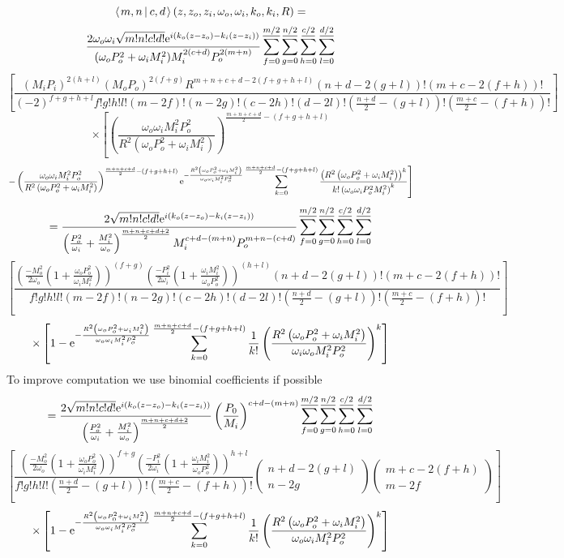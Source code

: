 \documentclass[11pt]{amsart}
\makeatletter
\newcommand{\e}{{\rm e}}				%
\newcommand{\msp}[1]{\mspace{#1mu}}		%
\newcommand{\0}{\varnothing}		%
\newcommand{\brac}[2]{\left\langle\msp{2} #1\left\lvert \msp{3.5} #2 \right.\right\rangle}	%
\newcommand{\1}{!}
\newcommand{\2}{@}
\newcommand{\3}{\#}
\newcommand{\4}{\$}
\newcommand{\5}{\%}
\newcommand{\6}{$^\wedge$}
\newcommand{\7}{\&}
\newcommand{\8}{*}
\newcommand{\9}{(}
\makeatother
\begin{document}
\[
\brac{m,n}{c,d}(z,z_o,z_i,\omega_o,\omega_i,k_o,k_i,R) = 
\]
\[
\frac{2\omega_o\omega_i\sqrt{m!n!c!d!}\e^{i(k_o(z-z_o)-k_i(z-z_i))}}{(\omega_oP_o^2+\omega_iM_i^2)M_i^{2(c+d)}P_o^{2(m+n)}}\sum_{f=0}^{\underline{m/2}}\sum_{g=0}^{\underline{n/2}}\sum_{h=0}^{\underline{c/2}}\sum_{l=0}^{\underline{d/2}}
\]
\[
\left[\frac{(M_iP_i)^{2(h+l)}(M_oP_o)^{2(f+g)}R^{m+n+c+d-2(f+g+h+l)}(n+d-2(g+l))!(m+c-2(f+h))!}{(-2)^{f+g+h+l}f!g!h!l!(m-2f)!(n-2g)!(c-2h)!(d-2l)!\left(\frac{n+d}{2}-(g+l)\right)!\left(\frac{m+c}{2}-(f+h)\right)!}\right]
\]
\[
\times\left[\left(\frac{\omega_o\omega_iM_i^2P_o^2}{R^2\left(\omega_oP_o^2+\omega_iM_i^2\right)}\right)^{\frac{m+n+c+d}{2}-(f+g+h+l)}\right.
\]
\[
\left.-\left(\frac{\omega_o\omega_iM_i^2P_o^2}{R^2\left(\omega_oP_o^2+\omega_iM_i^2\right)}\right)^{\frac{m+n+c+d}{2}-(f+g+h+l)}\e^{-\frac{R^2\left(\omega_oP_o^2+\omega_iM_i^2\right)}{\omega_o\omega_iM_i^2P_o^2}}\sum_{k=0}^{\frac{m+n+c+d}{2}-(f+g+h+l)}\frac{\left(R^2\left(\omega_oP_o^2+\omega_iM_i^2\right)\right)^k}{k!\left(\omega_o\omega_iP_o^2M_i^2\right)^k}\right]
\]
\[
=\frac{2\sqrt{m!n!c!d!}\e^{i(k_o(z-z_o)-k_i(z-z_i))}}{\left(\frac{P_o^2}{\omega_i}+\frac{M_i^2}{\omega_o}\right)^{\frac{m+n+c+d+2}{2}}M_i^{c+d-(m+n)}P_o^{m+n-(c+d)}}\sum_{f=0}^{\underline{m/2}}\sum_{g=0}^{\underline{n/2}}\sum_{h=0}^{\underline{c/2}}\sum_{l=0}^{\underline{d/2}}
\]
\[
\left[\frac{\left(\frac{-M_o^2}{2\omega_o}\left(1+\frac{\omega_oP_o^2}{\omega_iM_i^2}\right)\right)^{(f+g)}\left(\frac{-P_i^2}{2\omega_i}\left(1+\frac{\omega_iM_i^2}{\omega_oP_o^2}\right)\right)^{(h+l)}(n+d-2(g+l))!(m+c-2(f+h))!}{f!g!h!l!(m-2f)!(n-2g)!(c-2h)!(d-2l)!\left(\frac{n+d}{2}-(g+l)\right)!\left(\frac{m+c}{2}-(f+h)\right)!}\right]
\]
\[
\times\left[1-\e^{-\frac{R^2\left(\omega_oP_o^2+\omega_iM_i^2\right)}{\omega_o\omega_iM_i^2P_o^2}}\sum_{k=0}^{\frac{m+n+c+d}{2}-(f+g+h+l)}\frac{1}{k!}\left(\frac{R^2\left(\omega_oP_o^2+\omega_iM_i^2\right)}{\omega_i\omega_oM_i^2P_o^2}\right)^k\right]
\]
To improve computation we use binomial coefficients if possible
\[
=\frac{2\sqrt{m!n!c!d!}\e^{i(k_o(z-z_o)-k_i(z-z_i))}}{\left(\frac{P_o^2}{\omega_i}+\frac{M_i^2}{\omega_o}\right)^{\frac{m+n+c+d+2}{2}}}\left(\frac{P_0}{M_i}\right)^{c+d-(m+n)}\sum_{f=0}^{\underline{m/2}}\sum_{g=0}^{\underline{n/2}}\sum_{h=0}^{\underline{c/2}}\sum_{l=0}^{\underline{d/2}}
\]
\[
\left[\frac{\left(\frac{-M_o^2}{2\omega_o}\left(1+\frac{\omega_oP_o^2}{\omega_iM_i^2}\right)\right)^{f+g}\left(\frac{-P_i^2}{2\omega_i}\left(1+\frac{\omega_iM_i^2}{\omega_oP_o^2}\right)\right)^{h+l}}{f!g!h!l!\left(\frac{n+d}{2}-(g+l)\right)!\left(\frac{m+c}{2}-(f+h)\right)!}\begin{pmatrix}n+d-2(g+l)\\ n-2g\end{pmatrix}\begin{pmatrix}m+c-2(f+h)\\ m-2f \end{pmatrix}\right]
\]
\[
\times \left[1-\e^{-\frac{R^2\left(\omega_oP_0^2+\omega_iM_i^2\right)}{\omega_o\omega_iM_i^2P_o^2}}\sum_{k=0}^{\frac{m+n+c+d}{2}-(f+g+h+l)}\frac{1}{k!}\left(\frac{R^2\left(\omega_oP_o^2+\omega_iM_i^2\right)}{\omega_o\omega_iM_i^2P_o^2}\right)^k\right]
\]
\end{document}
